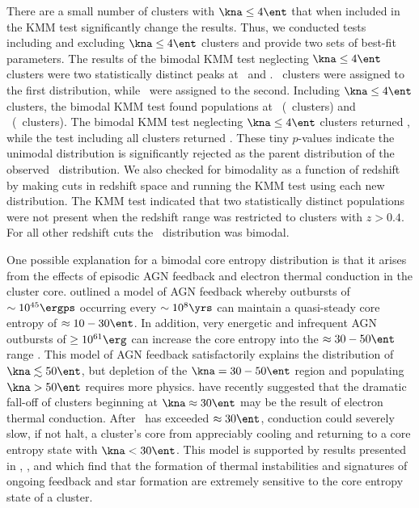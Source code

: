 \documentclass{emulateapj}
\begin{document}
There are a small number of clusters with $\kna \le 4 \ent$ that when
included in the KMM test significantly change the results. Thus, we
conducted tests including and excluding $\kna \le 4 \ent$ clusters and
provide two sets of best-fit parameters. The results of the bimodal
KMM test neglecting $\kna \le 4 \ent$ clusters were two statistically
distinct peaks at \kmma\ and \kmmb. \kmmc\ clusters were assigned to
the first distribution, while \kmmd\ were assigned to the
second. Including $\kna \le 4 \ent$ clusters, the bimodal KMM test
found populations at \kmmf\ (\kmmh\ clusters) and
\kmmg\ (\kmmi\ clusters). The bimodal KMM test neglecting $\kna \le 4
\ent$ clusters returned \kmme, while the test including all clusters
returned \kmmj. These tiny $p$-values indicate the unimodal
distribution is significantly rejected as the parent distribution of
the observed \kna\ distribution. We also checked for bimodality as a
function of redshift by making cuts in redshift space and running the
KMM test using each new distribution. The KMM test indicated that two
statistically distinct populations were not present when the redshift
range was restricted to clusters with $z > 0.4$. For all other
redshift cuts the \kna\ distribution was bimodal.

One possible explanation for a bimodal core entropy distribution is
that it arises from the effects of episodic AGN feedback and electron
thermal conduction in the cluster core. \citet{agnframework} outlined
a model of AGN feedback whereby outbursts of $\sim 10^{45} \ergps$
occurring every $\sim 10^8 \yrs$ can maintain a quasi-steady core
entropy of $\approx 10-30 \ent$. In addition, very energetic and
infrequent AGN outbursts of $\geq 10^{61} \erg$ can increase the core
entropy into the $\approx 30-50 \ent$ range \citep{agnframework}. This
model of AGN feedback satisfactorily explains the distribution of
$\kna \lesssim 50 \ent$, but depletion of the $\kna = 30-50 \ent$
region and populating $\kna > 50 \ent$ requires more
physics. \citet{conduction} have recently suggested that the dramatic
fall-off of clusters beginning at $\kna \approx 30 \ent$ may be the
result of electron thermal conduction. After \kna\ has exceeded
$\approx 30 \ent$, conduction could severely slow, if not halt, a
cluster's core from appreciably cooling and returning to a core
entropy state with $\kna < 30 \ent$. This model is supported by
results presented in \citet{haradent}, \citet{2008arXiv0804.3823G},
and \citet{2008arXiv0802.1864R} which find that the formation of
thermal instabilities and signatures of ongoing feedback and star
formation are extremely sensitive to the core entropy state of a
cluster.
\end{document}
